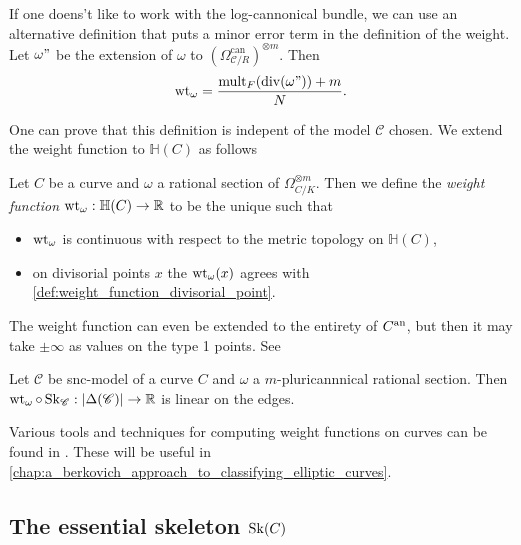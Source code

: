 \begin{remark}
	If one doens't like to work with the log-cannonical bundle, we can use an alternative definition that puts a minor error term in the definition of the weight. 
	Let $\omega"$ be the extension of $\omega$ to $(\Omega_{\mathscr C / R}^{\text{can}})^{\otimes m}$. Then \[
		\operatorname{wt}_{\omega} = \frac{\operatorname{mult}_F(\operatorname{div} (\omega")) + m}{N}
	.\] 
\end{remark}
One can prove that this definition is indepent of the model $\mathscr C$ chosen. 
We extend the weight function to $\mathbb{H}(C)$ as follows 
\begin{definition}\label{def:weight_function}
	Let $C$ be a curve and $\omega$ a rational section of $\Omega_{C / K}^{\otimes m}$. 
	Then we define the \emph{weight function} $\operatorname{wt}_{\omega}: \mathbb{H}(C) \to \mathbb{R}$ to be the unique such that 
	\begin{itemize}
		\item $\operatorname{wt}_{\omega}$ is continuous with respect to the metric topology on $\mathbb{H}(C)$, 
		\item on divisorial points $x$ the $\operatorname{wt}_{\omega}(x)$ agrees with \cref{def:weight_function_divisorial_point}.
	\end{itemize}
\end{definition}

The weight function can even be extended to the entirety of $C{}^{\text{an}}$, but then it may take $\pm \infty$ as values on the type 1 points. See \cite[§4.5.4]{mustataWeightFunctionsNonArchimedean2015}

\begin{proposition}
	Let $\mathscr C$ be snc-model of a curve $C$ and $\omega$ a $m$-pluricannnical rational section. 
	Then $\operatorname{wt}_\omega \circ \operatorname{Sk}_{\mathscr C}: |\Delta(\mathscr C)| \to \mathbb{R}$ is linear on the edges. 
\end{proposition}

Various tools and techniques for computing weight functions on curves can be found in \cite{bakerWeightFunctionsBerkovich2016}. 
These will be useful in \cref{chap:a_berkovich_approach_to_classifying_elliptic_curves}. 

\subsection{The essential skeleton $\sk(C)$}\label{sec:the_essential_skeleton_sk_c$}

